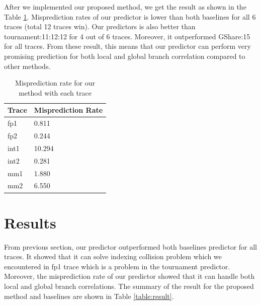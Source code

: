 \documentclass[conference]{IEEEtran}
\begin{document}
After we implemented our proposed method, we get the result as shown in the Table \ref{table:our_performance}.
Misprediction rates of our predictor is lower than both baselines for all 6 traces (total 12 traces win).
Our predictors is also better than tournament:11:12:12 for 4 out of 6 traces. Moreover,
it outperformed GShare:15 for all traces. From these result, this means that our predictor
can perform very promising prediction for both local and global branch correlation compared
to other methods.

\begin{scriptsize}
\begin{table}[h!]
  \centering
  \caption{Misprediction rate for our method with each trace}
  \label{table:our_performance}
  \begin{tabular}{|l|l|}
    \hline
    \textbf{Trace} & \textbf{Misprediction Rate}\\
    \hline
    \hline
    fp1 & 0.811 \\
    \hline
    fp2 & 0.244 \\
    \hline
    int1 & 10.294 \\
    \hline
    int2 & 0.281 \\
    \hline
    mm1 & 1.880 \\
    \hline
    mm2 & 6.550 \\
    \hline
  \end{tabular}
\end{table}
\end{scriptsize}
\section{Results}

From previous section, our predictor outperformed both baselines predictor
for all traces. It showed that it can solve indexing collision problem which we encountered
in fp1 trace which is a problem in the tournament predictor. Moreover, the
misprediction rate of our predictor showed that it can handle both local and global
branch correlations. The summary of the result for the proposed method and baselines
are shown in Table \ref{table:result}.
\end{document}
